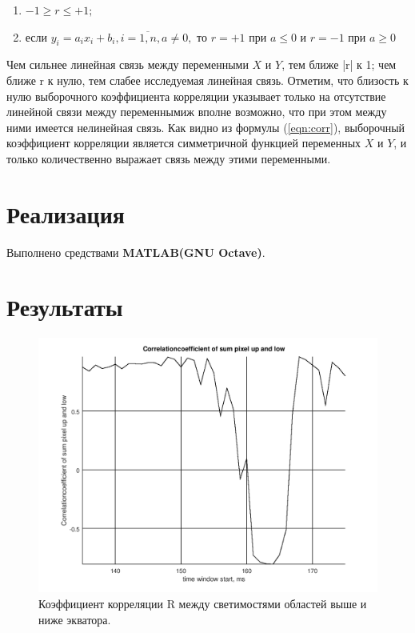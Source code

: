 \documentclass[12pt]{article}
\begin{document}
\begin{enumerate}
\item $-1 \geq r \leq +1;$
\item если $y_{i} = a_{i}x_{i} + b_{i}, i = \overline{1, n}, a \neq 0, $ то $r = + 1$ при $a\leq 0$ и $r = - 1$ при $a\geq 0$
\end{enumerate}

Чем сильнее линейная связь между переменными $X$ и $Y$, тем ближе |r| к 1; чем ближе r к нулю, тем слабее исследуемая линейная связь.
Отметим, что близость к нулю выборочного коэффициента корреляции указывает только на отсутствие линейной связи между переменнымиж вполне возможно, что при этом между ними имеется нелинейная связь.
Как видно из формулы (\ref{eqn:corr}), выборочный коэффициент корреляции является симметричной функцией переменных $X$ и $Y$, и только количественно выражает связь между этими переменными.\cite{max}
\section{Реализация}
Выполнено средствами \textbf{MATLAB(GNU Octave)}.

\section{Результаты}

\begin{figure}[H]
\caption{Коэффициент корреляции R между светимостями областей выше и ниже экватора.}
\includegraphics[scale = 0.8]{plot3.png} 
\end{figure}
\end{document}
